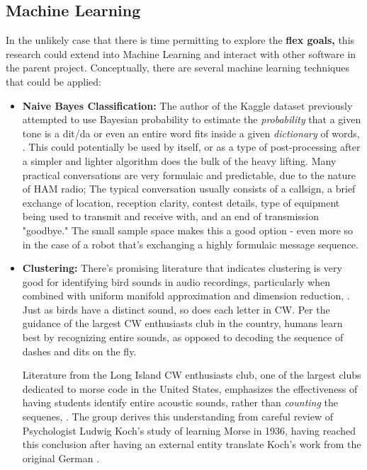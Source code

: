 \documentclass[11pt]{article}
\begin{document}
\subsection{Machine Learning}
\label{sec:org4770202}
In the unlikely case that there is time permitting to explore the \textbf{flex goals,} this research could extend into Machine Learning and interact with other software in the parent project.
Conceptually, there are several machine learning techniques that could be applied:

\begin{itemize}
\item \textbf{Naive Bayes Classification:}
The author of the Kaggle dataset previously attempted to use Bayesian probability to estimate the \emph{probability} that
a given tone is a dit/da or even an entire word fits inside a given \emph{dictionary} of words, \autocite{a1gleblog}. This could potentially
be used by itself, or as a type of post-processing after a simpler and lighter algorithm does the bulk of the
heavy lifting. Many practical conversations are very formulaic and predictable, due to the nature of HAM radio;
The typical conversation usually consists of a callsign, a brief exchange of location, reception clarity, contest details,
type of equipment being used to transmit and receive with, and an end of transmission "goodbye." The small sample space makes
this a good option - even more so in the case of a robot that's exchanging a highly formulaic message sequence.

\item \textbf{Clustering:}
There's promising literature that indicates clustering is very good for identifying bird sounds in audio recordings,
particularly when combined with uniform manifold approximation and dimension reduction, \autocite{RSoundAnalysis}.
Just as birds have a distinct sound, so does each letter in CW. Per the guidance of the largest CW enthusiasts club in the country,
humans learn best by recognizing entire sounds, as opposed to decoding the sequence of dashes and dits on the fly.

Literature from the Long Island CW enthusiasts club, one of the largest clubs dedicated to morse code in the United States,
emphasizes the effectiveness of having students identify entire acoustic sounds, rather than \emph{counting} the sequenes, \autocite{LICWTrainingMaterials}.
The group derives this understanding from careful review of Psychologist Ludwig Koch's study of learning Morse in 1936, having
reached this conclusion after having an external entity translate Koch's work from the original German \autocite{KochReport}.
\end{itemize}
\end{document}
